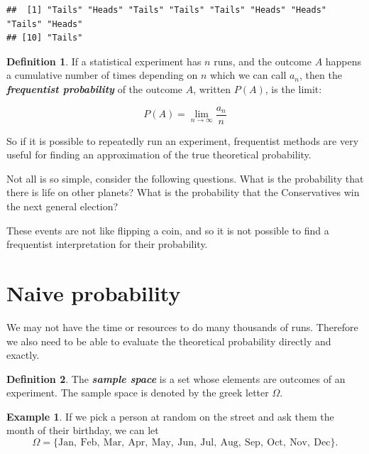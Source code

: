 \documentclass[
]{book}
\theoremstyle{definition}
\newtheorem{definition}{Definition}[chapter]
\theoremstyle{definition}
\newtheorem{example}{Example}[chapter]
\theoremstyle{definition}
\theoremstyle{definition}
\theoremstyle{remark}
\begin{document}
\begin{verbatim}
##  [1] "Tails" "Heads" "Tails" "Tails" "Tails" "Heads" "Heads" "Tails" "Heads"
## [10] "Tails"
\end{verbatim}

\begin{definition}
\protect\hypertarget{def:freq}{}\label{def:freq}If a statistical experiment has \(n\) runs, and the outcome \(A\) happens a cumulative number of times depending on \(n\) which we can call \(a_n\), then the \textbf{\emph{frequentist probability}} of the outcome \(A\), written \(P(A)\), is the limit:

\[P(A) = \lim_{n\to \infty} \frac{a_n}{n}\]
\end{definition}

So if it is possible to repeatedly run an experiment, frequentist methods are very useful for finding an approximation of the true theoretical probability.

Not all is so simple, consider the following questions. What is the probability that there is life on other planets? What is the probability that the Conservatives win the next general election?

These events are not like flipping a coin, and so it is not possible to find a frequentist interpretation for their probability.

\hypertarget{naive-probability}{%
\section{Naive probability}\label{naive-probability}}

We may not have the time or resources to do many thousands of runs. Therefore we also need to be able to evaluate the theoretical probability directly and exactly.

\begin{definition}
\protect\hypertarget{def:samplespace}{}\label{def:samplespace}The \textbf{\emph{sample space}} is a set whose elements are outcomes of an experiment. The sample space is denoted by the greek letter \(\Omega\).
\end{definition}

\begin{example}
\protect\hypertarget{exm:monthspace}{}\label{exm:monthspace}If we pick a person at random on the street and ask them the month of their birthday,
we can let
\[\Omega = \{\text{Jan}, \ \text{Feb}, \ \text{Mar},  \ \text{Apr}, \ \text{May}, \ \text{Jun}, \ \text{Jul}, \ \text{Aug}, \ \text{Sep}, \ \text{Oct}, \ \text{Nov}, \ \text{Dec} \}.\]
\end{example}
\end{document}
